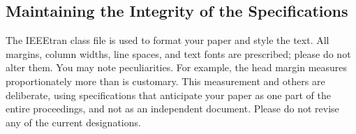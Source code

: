 \documentclass[conference]{IEEEtran}
\begin{document}
\subsection{Maintaining the Integrity of the Specifications}

The IEEEtran class file is used to format your paper and style the text. All margins, 
column widths, line spaces, and text fonts are prescribed; please do not 
alter them. You may note peculiarities. For example, the head margin
measures proportionately more than is customary. This measurement 
and others are deliberate, using specifications that anticipate your paper 
as one part of the entire proceedings, and not as an independent document. 
Please do not revise any of the current designations.




\end{document}
